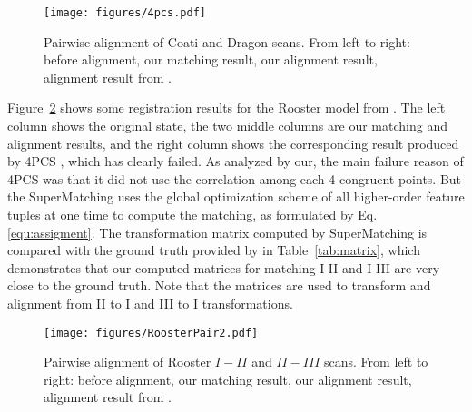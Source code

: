 \begin{figure}[t!]
\centering
  \texttt{[image: figures/4pcs.pdf]}
  \caption{Pairwise alignment of Coati and Dragon scans.
  From left to right: before alignment, our matching result, our alignment result, alignment result from \cite{Aiger08}.}
\label{fig:4pcs}
\end{figure}

Figure~\ref{fig:3DPair} shows some registration results for the Rooster model from \cite{Chuang09}. The left column shows the original state,
the two middle columns are our matching and alignment results, and
the right column shows the corresponding result produced by 4PCS \cite{Aiger08}, which has clearly failed.
As analyzed by our, the main failure reason of 4PCS was that it did not use the correlation among each 4 congruent points.
But the SuperMatching uses the global optimization scheme of all higher-order feature tuples at one time to compute the matching, as formulated by Eq. \ref{equ:assigment}.
The transformation matrix computed by SuperMatching is compared with the ground truth provided by \cite{Chuang09} in Table~\ref{tab:matrix},
which demonstrates that our computed matrices for matching I-II and I-III are very close to the ground truth.
Note that the matrices are used to transform and alignment from II to I and III to I transformations.
\begin{figure}[t!]
\centering
  \texttt{[image: figures/RoosterPair2.pdf]}
  \caption{Pairwise alignment of Rooster \emph{$I-II$} and \emph{$II-III$} scans.
  From left to right: before alignment, our matching result, our alignment result, alignment result from \cite{Aiger08}.}
\label{fig:3DPair}
\end{figure}

